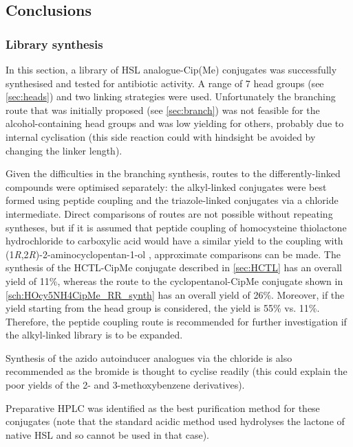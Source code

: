 \subsection{Conclusions}

\subsubsection{Library synthesis}

In this section, a library of HSL analogue-Cip(Me) conjugates was successfully synthesised and tested for antibiotic activity.
A range of 7 head groups (see \ref{sec:heads}) and two linking strategies were used.
Unfortunately the branching route that was initially proposed (see \ref{sec:branch}) was not feasible for the alcohol-containing head groups and was low yielding for others, probably due to internal cyclisation (this side reaction could with hindsight be avoided by changing the linker length).

Given the difficulties in the branching synthesis, routes to the differently-linked compounds were optimised separately: the alkyl-linked conjugates were best formed using peptide coupling and the triazole-linked conjugates via a chloride intermediate. 
Direct comparisons of routes are not possible without repeating syntheses, but if it is assumed that peptide coupling of homocysteine thiolactone hydrochloride  to carboxylic acid  would have a similar yield to the coupling with (1\textit{R},2\textit{R})-2-aminocyclopentan-1-ol , approximate comparisons can be made.
The synthesis of the HCTL-CipMe conjugate  described in \ref{sec:HCTL} has an overall yield of 11\%, whereas the route to the cyclopentanol-CipMe conjugate  shown in \ref{sch:HOcy5NH4CipMe_RR_synth} has an overall yield of 26\%. Moreover, if the yield starting from the head group is considered, the yield is 55\% vs. 11\%.
Therefore, the peptide coupling route is recommended for further investigation if the alkyl-linked library is to be expanded.

Synthesis of the azido autoinducer analogues via the chloride is also recommended as the bromide is thought to cyclise readily (this could explain the poor yields of the 2- and 3-methoxybenzene derivatives).

Preparative HPLC was identified as the best purification method for these conjugates (note that the standard acidic method used hydrolyses the lactone of native HSL and so cannot be used in that case).


